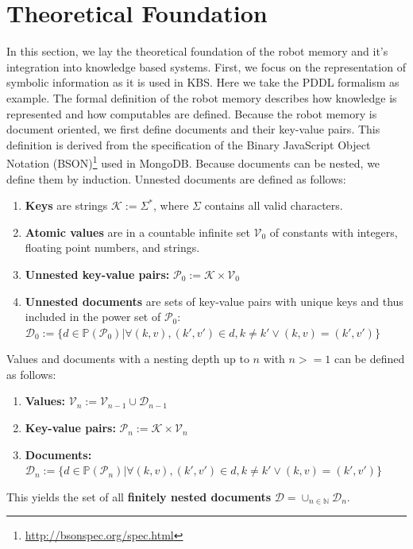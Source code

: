 \section{Theoretical Foundation}
\label{sec:formalism}
In this section, we lay the theoretical foundation of the robot memory
and it's integration into knowledge based systems. First, we focus on
the representation of symbolic information as it is used in KBS. Here
we take the PDDL formalism as example. The formal definition of the
robot memory describes how knowledge is represented and how
computables are defined. Because the robot memory is document
oriented, we first define documents and their key-value pairs. This
definition is derived from the specification of the Binary JavaScript
Object Notation (BSON)\footnote{\url{http://bsonspec.org/spec.html}}
used in MongoDB.  Because documents can be nested, we define them by
induction. Unnested documents are defined as follows:
\begin{enumerate}
\item \textbf{Keys} are strings $\mathcal{K} := \Sigma^*$, where
  $\Sigma$ contains all valid characters.
\item  \textbf{Atomic values} are in a countable infinite set $\mathcal{V}_0$ of constants with
  integers, floating point numbers, and strings.
\item \textbf{Unnested key-value pairs:} $\mathcal{P}_0:=\mathcal{K}\times\mathcal{V}_0$
\item \textbf{Unnested documents} are sets of key-value pairs with
  unique keys and thus included in the power set of $\mathcal{P}_0$:\\
  $\mathcal{D}_0:=\{
  d\in\mathbb{P}(\mathcal{P}_0)|
  \forall (k,v),(k',v')\in d , k\neq k' \vee (k,v)=(k',v')
  \}$
\end{enumerate}
Values and documents with a nesting depth up to $n$ with $n>=1$ can be
defined as follows:
\begin{enumerate}
\item  \textbf{Values:} $\mathcal{V}_n := \mathcal{V}_{n-1} \cup \mathcal{D}_{n-1}$
\item \textbf{Key-value pairs:} $\mathcal{P}_n:=\mathcal{K}\times\mathcal{V}_n$
\item \textbf{Documents:}
  $\mathcal{D}_n:=\{
  d\in\mathbb{P}(\mathcal{P}_n)|
  \forall (k,v),(k',v')\in d , k\neq k' \vee (k,v)=(k',v')
  \}$
\end{enumerate}
This yields the set of all \textbf{finitely nested documents}
$\mathcal{D}=\cup_{n\in\mathbb{N}}\mathcal{D}_n$.
